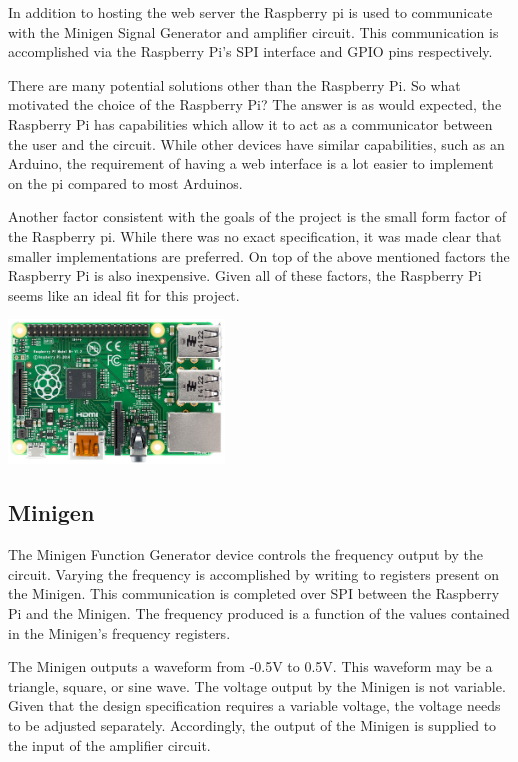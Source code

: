 \documentclass{article}	%
\begin{document}
\begin{multicols}{2}
In addition to hosting the web server the Raspberry pi is used to
communicate with the 
Minigen Signal Generator and 
amplifier circuit.
This communication is accomplished via 
the Raspberry Pi's SPI interface and
GPIO pins respectively.

There are many potential solutions other than 
the Raspberry Pi.
So what motivated the choice of the Raspberry Pi?
The answer is as would expected,
the Raspberry Pi has capabilities which allow it
to act as a communicator between 
the user and the circuit.
While other devices have similar capabilities,
such as an Arduino,
the requirement of having a web interface is a
lot easier to implement on the pi compared to
most Arduinos.

Another factor consistent with the goals
of the project is the small form factor
of the Raspberry pi.
While there was no exact specification,
it was made clear that smaller implementations
are preferred.
On top of the above mentioned factors
the Raspberry Pi is also inexpensive.
Given all of these factors,
the Raspberry Pi seems like an ideal
fit for this project.

\begin{center}
\includegraphics[width=0.43\textwidth,keepaspectratio]{rpi_real.png}
\end{center}

\subsection{Minigen}
The Minigen Function Generator device controls the frequency output by the circuit.
Varying the frequency is accomplished 
by writing to registers present on the Minigen.
This communication is completed over SPI between
the Raspberry Pi and the Minigen.
The frequency produced is a function of
the values contained in the Minigen's frequency registers.

The Minigen outputs a waveform 
from -0.5V to 0.5V. 
This waveform may be a triangle, square, or sine wave.
The voltage output by the Minigen is not variable.
Given that the design specification requires a variable voltage,
the voltage needs to be adjusted separately.
Accordingly, the output of the Minigen 
is supplied to the input of the amplifier circuit.


\end{multicols}
\end{document}
